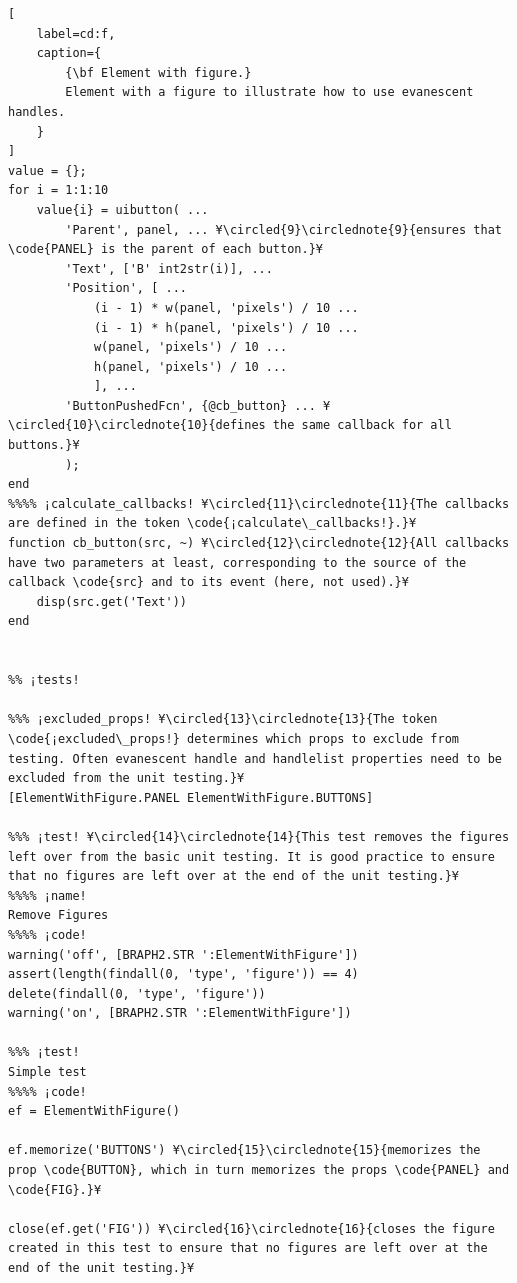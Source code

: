 \documentclass{tufte-handout}
\begin{document}
\begin{lstlisting}[
	label=cd:f,
	caption={
		{\bf Element with figure.}
		Element with a figure to illustrate how to use evanescent handles.
	}
]
value = {};
for i = 1:1:10
    value{i} = uibutton( ...
        'Parent', panel, ... ¥\circled{9}\circlednote{9}{ensures that \code{PANEL} is the parent of each button.}¥
        'Text', ['B' int2str(i)], ...
        'Position', [ ...
            (i - 1) * w(panel, 'pixels') / 10 ...
            (i - 1) * h(panel, 'pixels') / 10 ...
            w(panel, 'pixels') / 10 ...
            h(panel, 'pixels') / 10 ...
            ], ...
        'ButtonPushedFcn', {@cb_button} ... ¥\circled{10}\circlednote{10}{defines the same callback for all buttons.}¥
        );
end
%%%% ¡calculate_callbacks! ¥\circled{11}\circlednote{11}{The callbacks are defined in the token \code{¡calculate\_callbacks!}.}¥
function cb_button(src, ~) ¥\circled{12}\circlednote{12}{All callbacks have two parameters at least, corresponding to the source of the callback \code{src} and to its event (here, not used).}¥
    disp(src.get('Text'))
end


%% ¡tests!

%%% ¡excluded_props! ¥\circled{13}\circlednote{13}{The token \code{¡excluded\_props!} determines which props to exclude from testing. Often evanescent handle and handlelist properties need to be excluded from the unit testing.}¥
[ElementWithFigure.PANEL ElementWithFigure.BUTTONS]

%%% ¡test! ¥\circled{14}\circlednote{14}{This test removes the figures left over from the basic unit testing. It is good practice to ensure that no figures are left over at the end of the unit testing.}¥
%%%% ¡name!
Remove Figures
%%%% ¡code!
warning('off', [BRAPH2.STR ':ElementWithFigure'])
assert(length(findall(0, 'type', 'figure')) == 4) 
delete(findall(0, 'type', 'figure'))
warning('on', [BRAPH2.STR ':ElementWithFigure'])

%%% ¡test!
Simple test
%%%% ¡code!
ef = ElementWithFigure()

ef.memorize('BUTTONS') ¥\circled{15}\circlednote{15}{memorizes the prop \code{BUTTON}, which in turn memorizes the props \code{PANEL} and \code{FIG}.}¥

close(ef.get('FIG')) ¥\circled{16}\circlednote{16}{closes the figure created in this test to ensure that no figures are left over at the end of the unit testing.}¥
\end{lstlisting}

%
%
\end{document}
